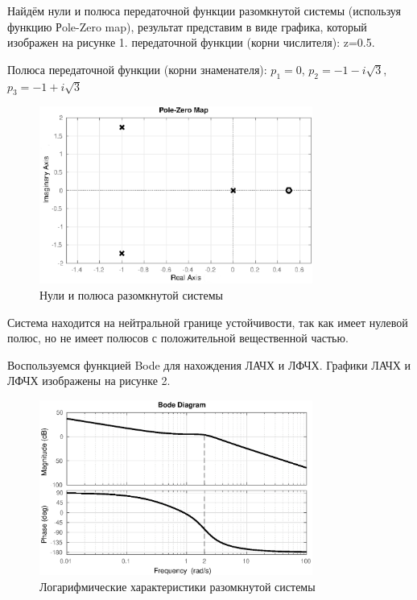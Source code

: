 \documentclass[12pt, a4paper]{article}
\begin{document}
\par Найдём нули и полюса передаточной функции разомкнутой системы (используя функцию Рole-Zero map), результат представим в виде графика, который изображен на рисунке 1.
 передаточной функции (корни числителя):
z=0.5.
\par Полюса передаточной функции (корни знаменателя):
$p_{1}=0$, $p_{2}=-1-i\sqrt{3}$, \\$p_{3}=-1+i\sqrt{3}$


\begin{figure}[H]
\centering
\includegraphics[width=0.8\textwidth]{1/im1.eps}
\caption{Нули и полюса разомкнутой системы}
\end{figure}
\par Система находится на нейтральной границе устойчивости, так как имеет нулевой полюс, но не имеет полюсов с положительной вещественной частью.
\par Воспользуемся функцией Bode для нахождения ЛАЧХ и ЛФЧХ. Графики ЛАЧХ и ЛФЧХ изображены на рисунке 2. 
\begin{figure}[H]
\centering
\includegraphics[width=0.8\textwidth]{1/bode2.eps}
\caption{Логарифмические характеристики разомкнутой системы}
\end{figure}
\end{document}
